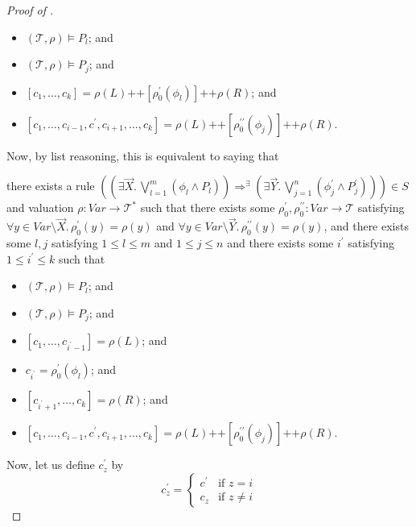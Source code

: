 \documentclass{article}
\newenvironment{proofenv}
  {
    \VerbatimEnvironment\begin{tcolorbox}[colback=black!0!white] %
  }
  {
   \end{tcolorbox}
  }
\begin{document}
\begin{proof}[Proof of ]
\begin{proofenv}
\begin{itemize}
    \item $(\mathcal{T}, \rho) \vDash P_l$; and
    \item $(\mathcal{T}, \rho) \vDash P_j$; and
    \item $[c_1,\ldots,c_k] = \rho(L) \texttt{++} [\rho_0^\prime(\phi_l)] \texttt{++} \rho(R)$; and
    \item $[c_1, \ldots, c_{i-1}, c^\prime, c_{i+1}, \ldots, c_k] = \rho(L)
    \texttt{++} [\rho_0^{\prime\prime}(\phi_j)] 
    \texttt{++} \rho(R)$.
\end{itemize}
\end{proofenv}
Now, by list reasoning, this is equivalent to
saying that
\begin{proofenv}
there exists a rule $((\exists \vec{X}.\, \bigvee_{l=1}^{m} (\phi_l \land P_l)) \Rightarrow^\exists (\exists \vec{Y}.\, \bigvee_{j=1}^{n} (\phi^\prime_j \land P^\prime_j))) \in S$
and valuation $\rho : \mathit{Var} \to \mathcal{T}^*$ such that
there exists some $\rho_0^\prime,\rho_0^{\prime\prime} : \mathit{Var} \to \mathcal{T}$
satisfying $\forall y \in \mathit{Var} \setminus \vec{X}.\, \rho_0^\prime(y) = \rho(y)$
and $\forall y \in \mathit{Var} \setminus \vec{Y}.\, \rho_0^{\prime\prime}(y) = \rho(y)$,
and there exists some $l,j$ satisfying $1 \leq l \leq m$ and $1 \leq j \leq n$
and there exists some $i^\prime$ satisfying $1 \leq i^\prime \leq k$
such that
\begin{itemize}
    \item $(\mathcal{T}, \rho) \vDash P_l$; and
    \item $(\mathcal{T}, \rho) \vDash P_j$; and
    \item $[c_1,\ldots, c_{i^\prime-1}] = \rho(L)$; and
    \item $c_{i^\prime} = \rho_0^\prime(\phi_l)$; and
    \item $[c_{i^\prime+1},\ldots,c_k] = \rho(R)$; and
    \item $[c_1, \ldots, c_{i-1}, c^\prime, c_{i+1}, \ldots, c_k] = \rho(L)
    \texttt{++} [\rho_0^{\prime\prime}(\phi_j)] 
    \texttt{++} \rho(R)$.
\end{itemize}
\end{proofenv}
Now, let us define $c^\prime_{z}$ by
\begin{equation*}
c^\prime_{z} =
    \begin{cases}
        c^\prime & \text{if } z = i \\
        c_z & \text{if } z \not = i
    \end{cases}
\end{equation*}

\end{proof}
\end{document}
